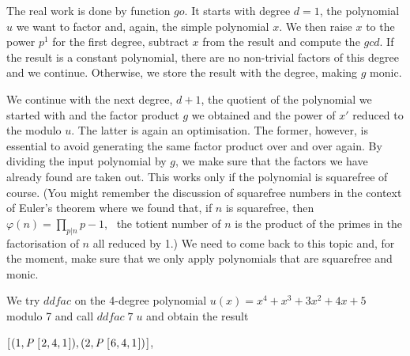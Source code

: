 \documentclass[tikz]{scrreprt}
\makeatletter
\newcommand{\Conid}[1]{\mathit{#1}}
\newcommand{\Varid}[1]{\mathit{#1}}
\newcommand{\anonymous}{\kern0.06em \vbox{\hrule\@width.5em}}
\def\resethooks{%
  \global\let\SaveRestoreHook\empty
  \global\let\ColumnHook\empty}
\makeatother
\begin{document}
\begin{minipage}{\textwidth}
\)\par\noindent\endgroup\resethooks
\end{minipage}

The real work is done by function \ensuremath{\Varid{go}}.
It starts with degree $d=1$, the polynomial $u$
we want to factor and, again, the simple polynomial $x$.
We then raise $x$ to the power $p^1$ for the first degree,
subtract $x$ from the result and compute the \ensuremath{\Varid{gcd}}.
If the result is a constant polynomial,
there are no non-trivial factors of this degree and we continue.
Otherwise, we store the result with the degree,
making $g$ monic. 

We continue with the next degree, $d+1$,
the quotient of the polynomial we started with and
the factor product $g$ we obtained and
the power of \ensuremath{\Varid{x'}} reduced to the modulo $u$.
The latter is again an optimisation.
The former, however, is essential to avoid
generating the same factor product over and over again.
By dividing the input polynomial by $g$, we make sure
that the factors we have already found are taken out.
This works only if the polynomial is squarefree of course.
(You might remember the discussion of squarefree
numbers in the context of Euler's theorem where we found
that, if $n$ is squarefree, then 
$\varphi(n) = \prod_{p|n}{p-1}$, \ie\ the totient number
of $n$ is the product of the primes in the factorisation
of $n$ all reduced by 1.)
We need to come back to this topic and, for the moment,
make sure that we only apply polynomials that are
squarefree and monic.

We try \ensuremath{\Varid{ddfac}} on the 4-degree polynomial 
$u(x) = x^4 + x^3 + 3x^2 + 4 x + 5$ modulo 7 and call
\ensuremath{\Varid{ddfac}\;\mathrm{7}\;\Varid{u}} and obtain the result

\ensuremath{[\mskip1.5mu (\mathrm{1},\Conid{P}\;[\mskip1.5mu \mathrm{2},\mathrm{4},\mathrm{1}\mskip1.5mu]),(\mathrm{2},\Conid{P}\;[\mskip1.5mu \mathrm{6},\mathrm{4},\mathrm{1}\mskip1.5mu])\mskip1.5mu]},
\end{document}
